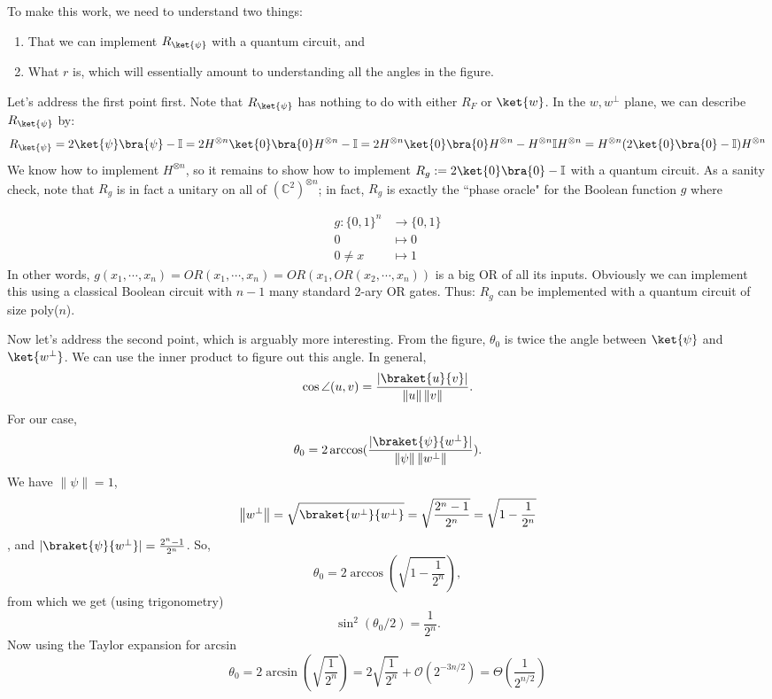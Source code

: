 \documentclass{article}
\newcommand{\norm}[1]{\left\lVert #1 \right\rVert}
\newcommand{\bbC}{\mathbb{C}}
\newcommand{\qbit}{\bbC^2}
\newcommand{\qbits}[1]{(\qbit)^{\otimes #1}}
\begin{document}
To make this work, we need to understand two things:
\begin{enumerate}
	\item That we can implement $R_{\ket{\psi}}$ with a quantum circuit, and
	\item What $r$ is, which will essentially amount to understanding all the angles in the figure.
\end{enumerate}		

Let's address the first point first.
Note that $R_{\ket{\psi}}$ has nothing to do with either $R_F$ or $\ket{w}$. In the $w,w^{\perp}$ plane, we can describe $R_{\ket{\psi}}$ by:
\[R_{\ket{\psi}} = 2  \ket{\psi}\bra{\psi} - \mathbb{I} \\ = 2H^{\otimes n}\ket{0}\bra{0} H^{\otimes n} - \mathbb{I} \\ = 2H^{\otimes n}\ket{0}\bra{0} H^{\otimes n} - H^{\otimes n}\mathbb{I}H^{\otimes n} = H^{\otimes n}(2\ket{0}\bra{0}-\mathbb{I})H^{\otimes n}\]
We know how to implement $H^{\otimes n}$, so it remains to show how to implement $R_g := 2\ket{0}\bra{0}-\mathbb{I}$ with a quantum circuit. As a sanity check, note that $R_g$ is in fact a unitary on all of $\qbits{n}$; in fact, $R_g$ is exactly the ``phase oracle" for the Boolean function $g$ where

	\[\begin{aligned}
	g: \{0,1\}^n &\to \{0,1\}\\
	0 &\mapsto 0 \\
    0\neq x &\mapsto 1
	\end{aligned}\]
In other words, $g(x_1, \dotsb, x_n)=OR(x_1, \dotsb, x_n) = OR(x_1, OR(x_2, \dotsb, x_n))$ is a big OR of all its inputs.  Obviously we can implement this using a classical Boolean circuit with $n-1$ many standard 2-ary OR gates.  Thus:
    $R_g$ can be implemented with a quantum circuit of size poly($n$).

Now let's address the second point, which is arguably more interesting.
From the figure, $\theta_0$ is twice the angle between $\ket{\psi}$ and $\ket{w^{\perp}}$. We can use the inner product to figure out this angle. In general, \[\cos \angle(u,v) = \frac{|\braket{u}{v}|}{\norm{u}\norm{v}}.\] For our case, \[\theta_0 = 2\arccos (\frac{|\braket{\psi}{w^{\perp}}|}{\norm{\psi}\norm{w^{\perp}}}).\] We have $\norm{\psi}=1$, \[\norm{w^{\perp}} = \sqrt{\braket{w^{\perp}}{w^{\perp}}} = \sqrt{\frac{2^n-1}{2^n}} = \sqrt{1-\frac{1}{2^n}}\], and $|\braket{\psi}{w^{\perp}}|= \frac{2^n-1}{2^n}$. So,
\[\theta_0 = 2\arccos(\sqrt{1-\frac{1}{2^n}}),\] from which we get (using trigonometry) \[\sin^2(\theta_0/2)=\frac{1}{2^n}.\] Now using the Taylor expansion for arcsin \[\theta_0= 2\arcsin(\sqrt{\frac{1}{2^n}})= 2 \sqrt{\frac{1}{2^n}}+\mathcal{O}(2^{-3n/2})=\Theta(\frac{1}{2^{n/2}})\]
\end{document}
